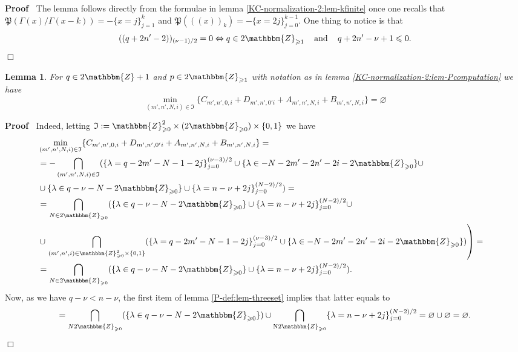 \documentclass{article}
\newcommand{\Nu}{\mathrm{N}}
\newcommand{\assign}{:=}
\newcommand{\nobracket}{}
\newcommand{\tmop}[1]{\ensuremath{\operatorname{#1}}}
\newenvironment{proof}{\noindent\textbf{Proof\ }}{\hspace*{\fill}$\Box$\medskip}
\numberwithin{definition}{section}
\newtheorem{lemma}{Lemma}
\numberwithin{lemma}{section}
\numberwithin{proposition}{section}
{\theorembodyfont{\rmfamily}\newtheorem{remark}{Remark}
\numberwithin{remark}{section}
}
\begin{document}
\begin{proof}
  The lemma follows directly from the formulae in lemma
  \ref{KC-normalization-2:lem-kfinite} once one recalls that $\mathfrak{P} (
  \Gamma ( x) / \Gamma ( x - k)) = - \{ x = j \}_{j = 1}^k$ and $\mathfrak{P}
  ( ( ( x))_k) = - \{ x = 2 j \}_{j = 0}^{k - 1}$. One thing to notice is that
  \[ ( ( q + 2 n' - 2))_{( \nu - 1) / 2} = 0 \Leftrightarrow q \in
     2\mathbbm{Z}_{\geqslant 1} \hspace{1em} \tmop{and} \hspace{1em} q + 2 n'
     - \nu + 1 \leqslant 0. \]
\end{proof}

\begin{lemma}
  \label{KC-normalization-2:lem-normalization-qodd-aux-1}For $q \in
  2\mathbbm{Z}+ 1$ and $p \in 2\mathbbm{Z}_{\geqslant 1}$ with notation as in
  lemma \ref{KC-normalization-2:lem-Pcomputation} we have
  \[ \min_{( m', n', N, i) \in \mathfrak{I}} \{ C_{m', n', 0, i} + D_{m', n',
     0' i} + A_{m', n', N, i} + B_{m', n', N, i} \} = \varnothing \]
\end{lemma}

\begin{proof}
  Indeed, letting $\mathfrak{I} \assign \mathbbm{Z}_{\geqslant 0}^2 \times (
  2\mathbbm{Z}_{\geqslant 0}) \times \{ 0, 1 \}$ we have
  \begin{eqnarray}
    & \min_{( m', n', N, i) \in \mathfrak{I}} \{ C_{m', n', 0, i} + D_{m',
    n', 0' i} + A_{m', n', N, i} + B_{m', n', N, i} \} = &  \nonumber\\
    & = - \bigcap_{( m', n', N, i) \in \mathfrak{I}} ( \{ \lambda = q - 2 m'
    - N - 1 - 2 j \}_{j = 0}^{( \nu - 3) / 2} \cup \{ \lambda \in - N - 2 m' -
    2 n' - 2 i - 2\mathbbm{Z}_{\geqslant 0} \} \nobracket \cup &  \nonumber\\
    & \cup \{ \lambda \in q - \nu - N - 2\mathbbm{Z}_{\geqslant 0} \}
    \nobracket \cup \{ \lambda = n - \nu + 2 j \}_{j = 0}^{( N - 2) / 2}) = & 
    \nonumber\\
    & = \bigcap_{N \in 2\mathbbm{Z}_{\geqslant 0}} ( \{ \lambda \in q - \nu -
    N - 2\mathbbm{Z}_{\geqslant 0} \} \cup \{ \lambda = n - \nu + 2 j \}_{j =
    0}^{( N - 2) / 2} \cup \nobracket &  \nonumber\\
    & \cup \left. \bigcap_{( m', n', i) \in \mathbbm{Z}_{\geqslant 0}^2
    \times \{ 0, 1 \}} ( \{ \lambda = q - 2 m' - N - 1 - 2 j \}_{j = 0}^{( \nu
    - 3) / 2} \cup \{ \lambda \in - N - 2 m' - 2 n' - 2 i -
    2\mathbbm{Z}_{\geqslant 0} \}) \right) = &  \nonumber\\
    & = \bigcap_{N \in 2\mathbbm{Z}_{\geqslant 0}} ( \{ \lambda \in q - \nu -
    N - 2\mathbbm{Z}_{\geqslant 0} \} \cup \{ \lambda = n - \nu + 2 j \}_{j =
    0}^{( N - 2) / 2}) . &  \nonumber
  \end{eqnarray}
  Now, as we have $q - \nu < n - \nu$, the first item of lemma
  \ref{P-def:lem-threeset} implies that latter equals to
  \[ = \bigcap_{N 2\mathbbm{Z}_{\geqslant 0}} ( \{ \lambda \in q - \nu - N -
     2\mathbbm{Z}_{\geqslant 0} \}) \cup \bigcap_{\Nu 2\mathbbm{Z}_{\geqslant
     0}} \{ \lambda = n - \nu + 2 j \}_{j = 0}^{( N - 2) / 2} = \varnothing
     \cup \varnothing = \varnothing . \]
\end{proof}
\end{document}
